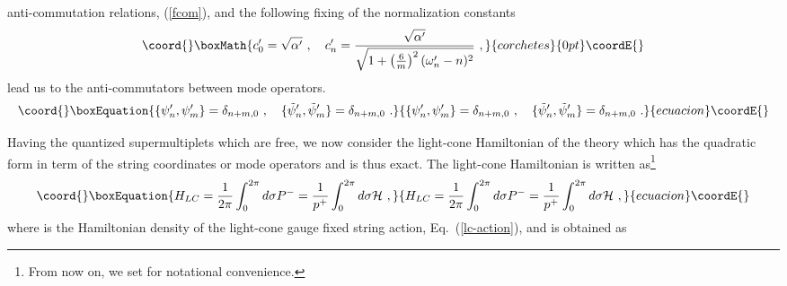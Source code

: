 \documentclass[a4paper,12pt]{article}
\begin{document}
anti-commutation relations, (\ref{fcom}), and the following fixing of
the normalization constants
\[\coord{}\boxMath{
c'_0 = \sqrt{\alpha'}~,~~~
c'_n = \frac{\sqrt{\alpha'}}{\sqrt{1 + 
          \left( \frac{6}{m} \right)^2 (\omega'_n - n)^2 } }~,
}{corchetes}{0pt}\coordE{}\]
lead us to the anti-commutators between mode operators.
\begin{equation}\coord{}\boxEquation{
\{ \psi'_n , \psi'_m \} = \delta_{n+m,0} ~,~~~
\{ \tilde{\psi}'_n, \tilde{\psi}'_m \} = \delta_{n+m,0}~.
\label{fpmcom}
}{
\{ \psi'_n , \psi'_m \} = \delta_{n+m,0} ~,~~~
\{ \tilde{\psi}'_n, \tilde{\psi}'_m \} = \delta_{n+m,0}~.
}{ecuacion}\coordE{}\end{equation}

Having the quantized \coordHE{} supermultiplets which are free, we now
consider the light-cone Hamiltonian of the theory which has the
quadratic form in term of the string coordinates or mode operators and
is thus exact.  The light-cone Hamiltonian is written as\footnote{
From now on, we set \coordHE{} for notational convenience.}
\begin{equation}\coord{}\boxEquation{
H_{LC} 
 = \frac{1}{2 \pi} \int^{2\pi}_0 d \sigma P^-
 = \frac{1}{p^+} \int^{2\pi}_0 d \sigma {\cal H} ~,
\label{lc-ham}
}{
H_{LC} 
 = \frac{1}{2 \pi} \int^{2\pi}_0 d \sigma P^-
 = \frac{1}{p^+} \int^{2\pi}_0 d \sigma {\cal H} ~,
}{ecuacion}\coordE{}\end{equation}
where \coordHE{} is the Hamiltonian density of the light-cone gauge
fixed string action, Eq.~(\ref{lc-action}), and is obtained as
\end{document}
